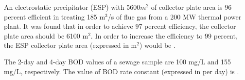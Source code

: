 \item An electrostatic precipitator (ESP) with $5600 m^{2}$ of collector plate area is 96 percent efficient in treating 185 m$^{3}$/s of flue gas from a 200 MW thermal power plant. It was found that in order to achieve 97 percent efficiency, the collector plate area should be 6100 m$^{2}$. In order to increase the efficiency to 99 percent, the ESP collector plate area (expressed in m$^{2}$) would be \underline{\hspace{3cm}}.\\

\item The 2-day and 4-day BOD values of a sewage sample are 100 mg/L and 155 mg/L, respectively. The value of BOD rate constant (expressed in per day) is \underline{\hspace{3cm}}. \\

